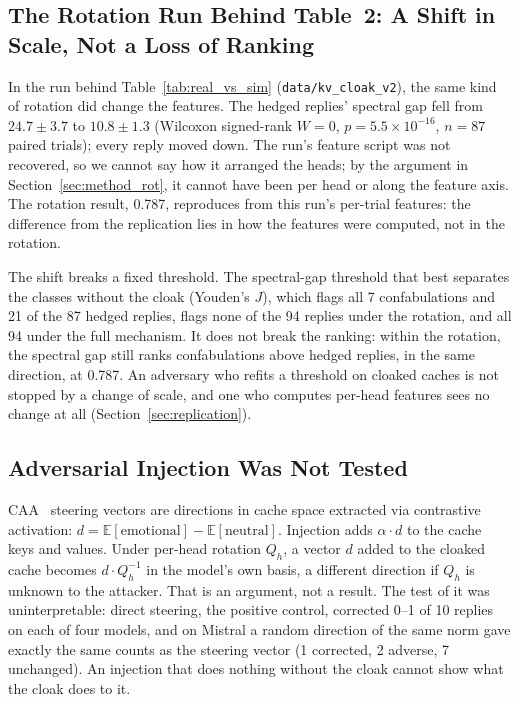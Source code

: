 \subsection{The Rotation Run Behind Table~2: A Shift in Scale, Not a Loss of Ranking}
\label{sec:shift}

In the run behind Table~\ref{tab:real_vs_sim} (\texttt{data/kv\_cloak\_v2}),
the same kind of rotation did change the features. The hedged replies'
spectral gap fell from $24.7 \pm 3.7$ to $10.8 \pm 1.3$ (Wilcoxon
signed-rank $W = 0$, $p = 5.5 \times 10^{-16}$, $n = 87$ paired trials);
every reply moved down. The run's feature script was not recovered, so we
cannot say how it arranged the heads; by the argument in
Section~\ref{sec:method_rot}, it cannot have been per head or along the
feature axis. The rotation result, 0.787, reproduces from this run's
per-trial features: the difference from the replication lies in how the
features were computed, not in the rotation.

The shift breaks a fixed threshold. The spectral-gap threshold that best
separates the classes without the cloak (Youden's $J$), which flags all 7
confabulations and 21 of the 87 hedged replies, flags none of the 94 replies under the rotation, and all
94 under the full mechanism. It does not break the ranking: within the
rotation, the spectral gap still ranks confabulations above hedged
replies, in the same direction, at 0.787. An adversary who refits a
threshold on cloaked caches is not stopped by a change of scale, and one
who computes per-head features sees no change at all
(Section~\ref{sec:replication}).

\subsection{Adversarial Injection Was Not Tested}

CAA~\citep{panickssery2023caa} steering vectors are directions in cache space extracted via
contrastive activation: $d = \mathbb{E}[\text{emotional}] -
\mathbb{E}[\text{neutral}]$. Injection adds $\alpha \cdot d$ to the
cache keys and values. Under per-head rotation $Q_h$, a vector $d$ added
to the cloaked cache becomes $d \cdot Q_h^{-1}$ in the model's own basis,
a different direction if $Q_h$ is unknown to the attacker. That is an
argument, not a result. The test of it was uninterpretable: direct
steering, the positive control, corrected 0--1 of 10 replies on each of
four models, and on Mistral a random direction of the same norm gave
exactly the same counts as the steering vector (1 corrected, 2 adverse,
7 unchanged). An injection that does nothing without the cloak cannot show
what the cloak does to it.

